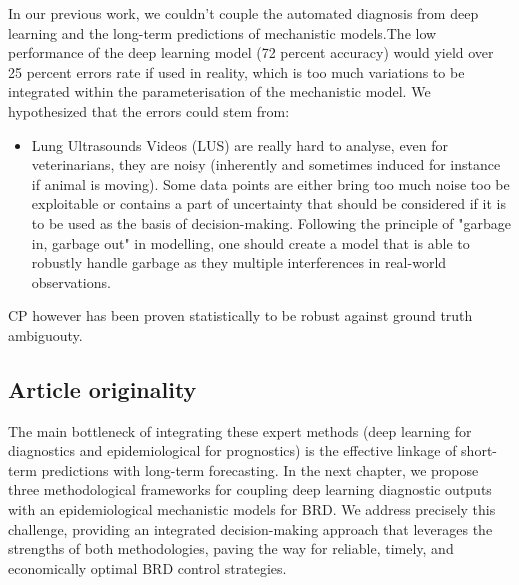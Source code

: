 In our previous work, we couldn't couple the automated diagnosis from deep learning and the long-term predictions of mechanistic models.The low performance of the deep learning model (72 percent accuracy) would yield over 25 percent errors rate if used in reality, which is too much variations to be integrated within the parameterisation of the mechanistic model. We hypothesized that the errors could stem from:
\begin{itemize}
    \item Lung Ultrasounds Videos (LUS) are really hard to analyse, even for veterinarians, they are noisy (inherently and sometimes induced for instance if animal is moving). Some data points are either bring too much noise too be exploitable or contains a part of uncertainty that should be considered if it is to be used as the basis of decision-making. Following the principle of "garbage in, garbage out" in modelling, one should create a model that is able to robustly handle garbage as they multiple interferences in real-world observations. 

\end{itemize}


CP however has been proven statistically to be robust against ground truth ambiguouty. 




\subsection{Article originality}

The main bottleneck of integrating these expert methods (deep learning for diagnostics and epidemiological for prognostics) is the effective linkage of short-term predictions with long-term forecasting. In the next chapter, we propose three methodological frameworks for coupling deep learning diagnostic outputs with an epidemiological mechanistic models for BRD. We address precisely this challenge, providing an integrated decision-making approach that leverages the strengths of both methodologies, paving the way for reliable, timely, and economically optimal BRD control strategies.


